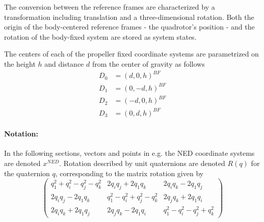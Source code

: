         The conversion between the reference frames are characterized by a
        transformation including translation and a three-dimensional rotation.
        Both the origin of the body-centered reference frames
        - the quadrotor's position - and the rotation of the body-fixed
        system are stored as system states.

        The centers of each of the propeller fixed coordinate systems
        are parametrized on the height $h$ and distance $d$ from the center of
        gravity as follows
        \begin{align}
            D_{0} &= (d, 0, h)^{BF} \\
            D_{1} &= (0, -d, h)^{BF} \\
            D_{2} &= (-d, 0, h)^{BF} \\
            D_{3} &= (0, d, h)^{BF}
        \end{align}

        \paragraph{Notation:}
        In the following sections, vectors and points in e.g. the NED
        coordinate systems are denoted $x^{NED}$.
        Rotation described by unit quaternions are denoted $R(q)$ for
        the quaternion $q$, corresponding to the matrix rotation \citep{kuipers2002quaternions} given by
        \begin{equation}
            \left(
            \begin{array}{cccc}
                q_{1}^{2} + q_{i}^{2} - q_{j}^{2} - q_{k}^{2}   & 2q_{i}q_{j}+2q_{1}q_{k}                       & 2q_{i}q_{k} - 2q_{1}q_{j} \\
                2q_{i}q_{j} - 2q_{1}q_{k}                       & q_{1}^{2} - q_{i}^{2} + q_{j}^{2} - q_{k}^{2} & 2q_{j}q_{k} + 2q_{1}q_{i} \\
                2q_{i}q_{k} + 2q_{1}q_{j}                       & 2q_{j}q_{k} - 2q_{1}q_{i}                     & q_{1}^{2} - q_{i}^{2} - q_{j}^{2} + q_{k}^{2}
            \end{array}
            \right)
        \end{equation}
